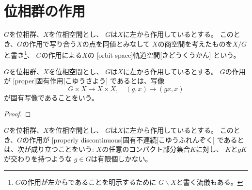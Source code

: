 \documentclass[report]{jlreq}
\begin{document}
%
\chapter{位相群の作用}

\begin{definition}[軌道空間]
    $G$を位相群、$X$を位相空間とし、
    $G$は$X$に左から作用しているとする。
    このとき、$G$の作用で写り合う$X$の点を同値とみなして
    $X$の商空間を考えたものを$X / G$と書き\footnote{
        $G$の作用が左からであることを明示するために
        $G \backslash X$と書く流儀もある。
    }、
    $G$の作用による$X$の
    [orbit space]{軌道空間}[きどうくうかん]
    という。
\end{definition}

\begin{proposition}[軌道空間への商写像は開写像]
    \TODO{}
\end{proposition}

\begin{definition}[固有作用]
    $G$を位相群、$X$を位相空間とし、
    $G$は$X$に左から作用しているとする。
    $G$の作用が
    [proper]{固有作用}[こゆうさよう]
    であるとは、写像
    \begin{equation}
        G \times X \to X \times X,
        \quad
        (g, x) \mapsto (gx, x)
    \end{equation}
    が固有写像であることをいう。
\end{definition}


\begin{proof}
    \TODO{}
\end{proof}


\begin{definition}[固有不連続]
    $G$を位相群、$X$を位相空間とし、
    $G$は$X$に左から作用しているとする。
    このとき、$G$の作用が
    [properly discontinuous]{固有不連続}[こゆうふれんぞく]
    であるとは、次が成り立つことをいう:
    $X$の任意のコンパクト部分集合$K$に対し、
    $K$と$gK$が交わりを持つような
    $g \in G$は有限個しかない。
\end{definition}
\end{document}
